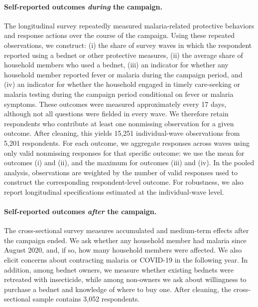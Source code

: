 \paragraph{Self-reported outcomes \textit{during} the campaign.}
The longitudinal survey repeatedly measured malaria-related protective behaviors and response actions over the course of the campaign. Using these repeated observations, we construct: (i) the share of survey waves in which the respondent reported using a bednet or other protective measures, (ii) the average share of household members who used a bednet, (iii) an indicator for whether any household member reported fever or malaria during the campaign period, and (iv) an indicator for whether the household engaged in timely care-seeking or malaria testing during the campaign period conditional on fever or malaria symptoms. These outcomes were measured approximately every 17 days, although not all questions were fielded in every wave. We therefore retain respondents who contribute at least one nonmissing observation for a given outcome. After cleaning, this yields 15,251 individual-wave observations from 5,201 respondents. For each outcome, we aggregate responses across waves using only valid nonmissing responses for that specific outcome: we use the mean for outcomes (i) and (ii), and the maximum for outcomes (iii) and (iv). In the pooled analysis, observations are weighted by the number of valid responses used to construct the corresponding respondent-level outcome. For robustness, we also report longitudinal specifications estimated at the individual-wave level. 

\paragraph{Self-reported outcomes \textit{after} the campaign.}
The cross-sectional survey measures accumulated and medium-term effects after the campaign ended. We ask whether any household member had malaria since August 2020, and, if so, how many household members were affected. We also elicit concerns about contracting malaria or COVID-19 in the following year. In addition, among bednet owners, we measure whether existing bednets were retreated with insecticide, while among non-owners we ask about willingness to purchase a bednet and knowledge of where to buy one. After cleaning, the cross-sectional sample contains 3,052 respondents. 




